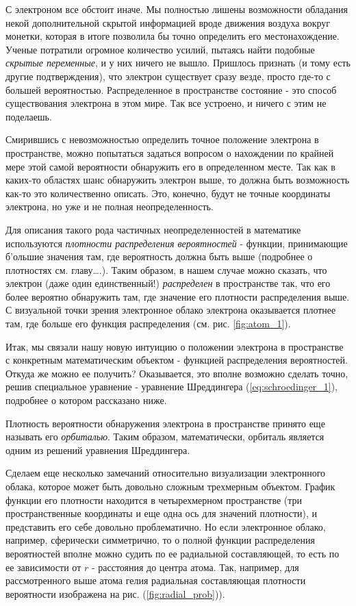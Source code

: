 С электроном все обстоит иначе.
Мы полностью лишены возможности обладания некой дополнительной скрытой информацией вроде движения воздуха вокруг монетки, которая в итоге позволила бы точно определить его местонахождение.
Ученые потратили огромное количество усилий, пытаясь найти подобные \textit{скрытые переменные}, и у них ничего не вышло.
Пришлось признать (и тому есть другие подтверждения), что электрон существует сразу везде, просто где-то с большей вероятностью. 
Распределенное в пространстве состояние - это способ существования электрона в этом мире.
Так все устроено, и ничего с этим не поделаешь. 

Смирившись с невозможностью определить точное положение электрона в пространстве, можно попытаться задаться вопросом о нахождении по крайней мере этой самой вероятности обнаружить его в определенном месте.
Так как в каких-то областях шанс обнаружить электрон выше, то должна быть возможность как-то это количественно описать.
Это, конечно, будут не точные координаты электрона, но уже и не полная неопределенность.

Для описания такого рода частичных неопределенностей в математике используются \textit{плотности распределения вероятностей} - функции, принимающие б'ольшие значения там, где вероятность должна быть выше (подробнее о плотностях см. главу….).
Таким образом, в нашем случае можно сказать, что электрон (даже один единственный!) \textit{распределен} в пространстве так, что его более вероятно обнаружить там, где значение его плотности распределения выше.
С визуальной точки зрения электронное облако электрона оказывается плотнее там, где больше его функция распределения (см. рис. \ref{fig:atom_1}).


Итак, мы связали нашу новую интуицию о положении электрона в пространстве с конкретным математическим объектом - функцией распределения вероятностей. 
Откуда же можно ее получить?
Оказывается, это вполне возможно сделать точно, решив специальное уравнение - уравнение Шреддингера  (\ref{eq:schroedinger_1}), подробнее о котором рассказано ниже.

Плотность вероятности обнаружения электрона в пространстве принято еще называть его \textit{орбиталью}.
Таким образом, математически, орбиталь является одним из решений уравнения Шреддингера.

Сделаем еще несколько замечаний относительно визуализации электронного облака, которое может быть довольно сложным трехмерным объектом.
График функции его плотности находится в четырехмерном пространстве (три пространственные координаты и еще одна ось для значений плотности), и представить его себе довольно проблематично.
Но если электронное облако, например, сферически симметрично, то о полной функции распределения вероятностей вполне можно судить по ее радиальной составляющей, то есть по ее зависимости от $r$ - расстояния до центра атома.
Так, например, для рассмотренного выше атома гелия радиальная составляющая плотности вероятности изображена на рис. (\ref{fig:radial_prob})).

